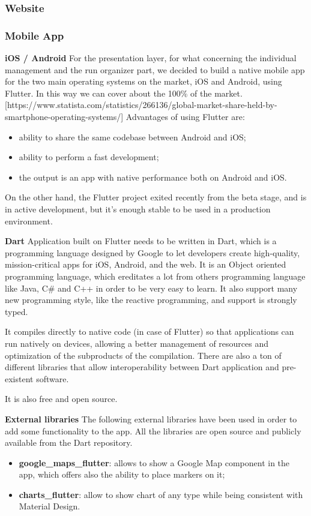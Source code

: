 \subsubsection{Website}

\subsubsection{Mobile App}
\textbf{iOS / Android}
For the presentation layer, for what concerning the individual management and the run organizer part, we decided to build a native mobile app for the two main operating systems on the market, iOS and Android, using Flutter.
In this way we can cover about the 100\% of the market. [https://www.statista.com/statistics/266136/global-market-share-held-by-smartphone-operating-systems/]
Advantages of using Flutter are:
\begin{itemize}
    \item ability to share the same codebase between Android and iOS;
    \item ability to perform a fast development;
    \item the output is an app with native performance both on Android and iOS.
\end{itemize}

On the other hand, the Flutter project exited recently from the beta stage, and is in active development, but it's enough stable to be used in a production environment.

\textbf{Dart} Application built on Flutter needs to be written in Dart, which is a programming language designed by Google to let developers create high-quality, mission-critical apps for iOS, Android, and the web. It is an Object oriented programming language, which ereditates a lot from others programming language like Java, C\# and C++ in order to be very easy to learn.
It also support many new programming style, like the reactive programming, and support is strongly typed.

It compiles directly to native code (in case of Flutter) so that applications can run natively on devices, allowing a better management of resources and optimization of the subproducts of the compilation.
There are also a ton of different libraries that allow interoperability between Dart application and pre-existent software.

It is also free and open source.

\textbf{External libraries} The following external libraries have been used in order to add some functionality to the app. All the libraries are open source and publicly available from the Dart repository.
\begin{itemize}
    \item \textbf{google\_maps\_flutter}: allows to show a Google Map component in the app, which offers also the ability to place markers on it;
    \item \textbf{charts\_flutter}: allow to show chart of any type while being consistent with Material Design.
\end{itemize}


